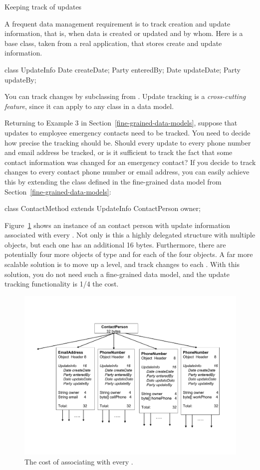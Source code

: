\begin{example}{Keeping track of updates} 

A frequent data management requirement is to track creation and update information, that is, when data is created or updated and by whom.  Here is a base class, taken from a real application, that stores create and update information.  
\begin{verbatim2}
class UpdateInfo {
     Date createDate;
     Party enteredBy;
     Date updateDate;
     Party updateBy;
}
\end{verbatim2}
You can track changes by subclassing from . Update tracking is
a \textit{cross-cutting feature}, since it can apply to any class in a data model.

\end{example}
Returning to Example 3 in Section~\ref{fine-grained-data-models}, suppose that
updates to employee emergency contacts need to be tracked. You need to decide
how precise the tracking should be. Should every update to every phone number
and email address be tracked, or is it sufficient to track the fact that some
contact information was changed for an emergency contact? If you decide to
track changes to every contact phone number or email address, you can easily achieve this by extending the  class defined in the fine-grained data model from Section~\ref{fine-grained-data-models}:
\begin{verbatim2}
class ContactMethod extends UpdateInfo {
     ContactPerson owner;
}
\end{verbatim2}
Figure~\ref{fig:big-base-class} shows an instance of an contact person with
update information associated with every . Not only is this
a highly delegated structure with multiple  objects, but
each one has an additional 16 bytes. Furthermore, there are potentially four
more objects of type  and  for each of the four
 objects. A far more scalable solution is to move up a
level, and track changes to each . With this solution, you
do not need such a fine-grained data model, and the update tracking functionality is 1/4 the cost.
\begin{figure}
  \centering
 \includegraphics[width=.70\textwidth]{Figures/chapter4/big-base-class.pdf}
  \caption{The cost of associating  with every
  .}
  \label{fig:big-base-class}
\end{figure}
 
